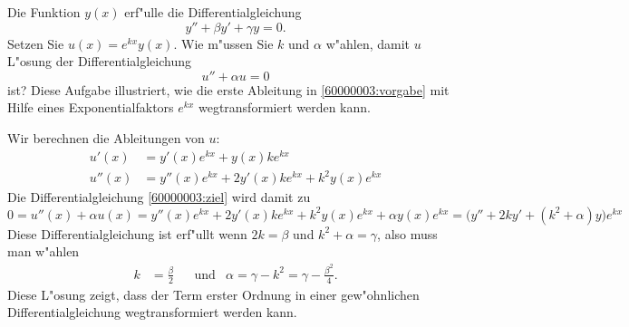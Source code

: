 Die Funktion $y(x)$ erf"ulle die Differentialgleichung
\begin{equation}
y''+\beta y' + \gamma y=0.
\label{60000003:vorgabe}
\end{equation}
Setzen Sie $u(x)=e^{k x}y(x)$.
Wie m"ussen Sie $k$ und $\alpha$ w"ahlen, damit $u$ L"osung der
Differentialgleichung
\begin{equation}
u''+\alpha u=0
\label{60000003:ziel}
\end{equation}
ist?
Diese Aufgabe illustriert, wie die erste Ableitung in
\eqref{60000003:vorgabe} mit Hilfe eines Exponentialfaktors $e^{kx}$
wegtransformiert werden kann.

\begin{loesung}
Wir berechnen die Ableitungen von $u$:
\begin{align*}
u'(x)&=y'(x)e^{kx}+y(x)ke^{kx}\\
u''(x)&=y''(x)e^{kx}+2y'(x)ke^{kx}+k^2y(x)e^{kx}
\end{align*}
Die Differentialgleichung  \eqref{60000003:ziel} wird damit
zu
\[
0
=
u''(x)+\alpha u(x)
=
y''(x)e^{kx}+2y'(x)ke^{kx}+k^2y(x)e^{kx}
+ \alpha y(x)e^{kx}
=
\bigl(
y''+2k y' +(k^2+\alpha)y
\bigr)
e^{kx}
\]
Diese Differentialgleichung ist erf"ullt wenn $2k=\beta$ und
$k^2+\alpha=\gamma$, also muss man w"ahlen
\[
\begin{aligned}
k&=\frac{\beta}2
&
&\text{und}&
\alpha=\gamma-k^2=\gamma-\frac{\beta^2}4.
\end{aligned}
\]
Diese L"osung zeigt, dass der Term erster Ordnung in einer gew"ohnlichen
Differentialgleichung wegtransformiert werden kann.
\end{loesung}

